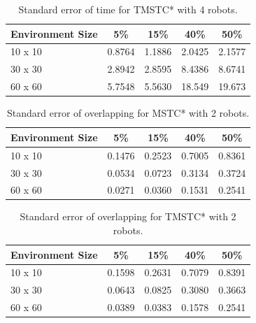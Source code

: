 \begin{table}[H]
    \caption{Standard error of time for TMSTC* with 4 robots.}
    \vspace{0.6em}
    \label{tab:time_tmstcstar_4robots}
    \centering
    \small
    \setlength{\tabcolsep}{10pt}
    \renewcommand{\arraystretch}{1.3}
    \begin{tabular}{lcccc}
        \hline
        \textbf{Environment Size} & \textbf{5\%} & \textbf{15\%} & \textbf{40\%} & \textbf{50\%} \\
        \hline
        10 x 10 & 0.8764 & 1.1886 & 2.0425 & 2.1577 \\
        30 x 30 & 2.8942 & 2.8595 & 8.4386 & 8.6741 \\
        60 x 60 & 5.7548 & 5.5630 & 18.549 & 19.673 \\
        \hline
    \end{tabular}
\end{table}

\begin{table}[H]
    \caption{Standard error of overlapping for MSTC* with 2 robots.}
    \vspace{0.6em}
    \label{tab:overlapping_mstcstar_2robots}
    \centering
    \small
    \setlength{\tabcolsep}{10pt}
    \renewcommand{\arraystretch}{1.3}
    \begin{tabular}{lcccc}
        \hline
        \textbf{Environment Size} & \textbf{5\%} & \textbf{15\%} & \textbf{40\%} & \textbf{50\%} \\
        \hline
        10 x 10 & 0.1476 & 0.2523 & 0.7005 & 0.8361 \\
        30 x 30 & 0.0534 & 0.0723 & 0.3134 & 0.3724 \\
        60 x 60 & 0.0271 & 0.0360 & 0.1531 & 0.2541 \\
        \hline
    \end{tabular}
\end{table}

\begin{table}[H]
    \caption{Standard error of overlapping for TMSTC* with 2 robots.}
    \vspace{0.6em}
    \label{tab:overlapping_tmstcstar_2robots}
    \centering
    \small
    \setlength{\tabcolsep}{10pt}
    \renewcommand{\arraystretch}{1.3}
    \begin{tabular}{lcccc}
        \hline
        \textbf{Environment Size} & \textbf{5\%} & \textbf{15\%} & \textbf{40\%} & \textbf{50\%} \\
        \hline
        10 x 10 & 0.1598 & 0.2631 & 0.7079 & 0.8391 \\
        30 x 30 & 0.0643 & 0.0825 & 0.3080 & 0.3663 \\
        60 x 60 & 0.0389 & 0.0383 & 0.1578 & 0.2541 \\
        \hline
    \end{tabular}
\end{table}

